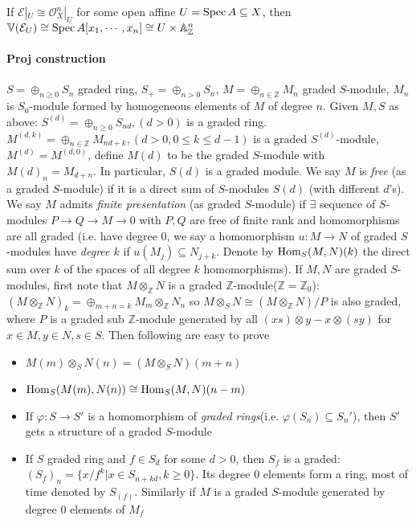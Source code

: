\documentclass[main]{subfiles}
\begin{document}
\begin{note}
If $\mathcal E|_U\cong\mathcal O_X^n|_U$ for some open affine $U=\operatorname{Spec} A\subseteq X$, then $\mathbb V(\mathcal E_U)\cong\operatorname{Spec} A[x_1,\cdots,x_n]\cong U\times\mathbb A_{\mathbb Z}^n$
\end{note}

\paragraph{Proj construction} $S=\oplus_{n\geq0}S_n$ graded ring, $S_+=\oplus_{n>0}S_n$, $M=\oplus_{n\in\mathbb Z} M_n$ graded $S$-module, $M_n$ is $S_0$-module formed by homogeneous elements of $M$ of degree $n$. Given $M,S$ as above: $S^{(d)}=\oplus_{n\geq0}S_{nd},(d>0)$ is a graded ring. $M^{(d,k)}=\oplus_{n\in\mathbb Z}M_{nd+k},(d>0,0\leq k\leq d-1)$ is a graded $S^{(d)}$-module, $M^{(d)}=M^{(d,0)}$, define $M(d)$ to be the graded $S$-module with $M(d)_n=M_{d+n}$. In particular, $S(d)$ is a graded module. We say $M$ is \textit{free} (as a graded $S$-module) if it is a direct sum of $S$-modules $S(d)$ (with different $d$'s). We say $M$ admits \textit{finite presentation} (as graded $S$-module) if $\exists$ sequence of $S$-modules $P\to Q\to M\to0$ with $P,Q$ are free of finite rank and homomorphisms are all graded (i.e. have degree $0$, we say a homomorphism $u:M\to N$ of graded $S$-modules have \textit{degree $k$} if $u(M_j)\subseteq N_{j+k}$. Denote by $\operatorname{Hom}_S(M,N)(k)$ the direct sum over $k$ of the spaces of all degree $k$ homomorphisms). If $M,N$ are graded $S$-modules, first note that $M\otimes_{\mathbb Z}N$ is a graded $\mathbb Z$-module($\mathbb Z=\mathbb Z_0$): $(M\otimes_{\mathbb Z}N)_k=\oplus_{m+n=k}M_m\otimes_{\mathbb Z}N_n$ so $M\otimes_SN\cong(M\otimes_{\mathbb Z}N)/P$ is also graded, where $P$ is a graded sub $\mathbb Z$-module generated by all $(xs)\otimes y-x\otimes(sy)$ for $x\in M,y\in N,s\in S$. Then following are easy to prove

\begin{itemize}
\item $M(m)\otimes_SN(n)=(M\otimes_SN)(m+n)$
\item $\operatorname{Hom}_S(M(m),N(n))\cong\operatorname{Hom}_S(M,N)(n-m)$
\end{itemize}

\begin{itemize}
\item If $\varphi:S\to S'$ is a homomorphism of \textit{graded rings}(i.e. $\varphi(S_n)\subseteq S_n'$), then $S'$ gets a structure of a graded $S$-module
\item If $S$ graded ring and $f\in S_d$ for some $d>0$, then $S_f$ is a graded: $(S_f)_n=\{x/f^k|x\in S_{n+kd},k\geq0\}$. Its degree $0$ elements form a ring, most of time denoted by $S_{(f)}$. Similarly if $M$ is a graded $S$-module generated by degree $0$ elements of $M_f$
\end{itemize}
\end{document}
